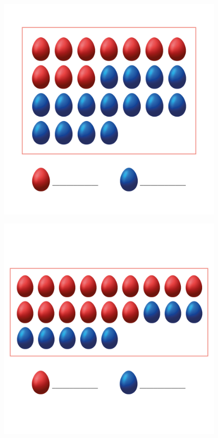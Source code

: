 \begin{figure}[htpb!]
\includegraphics[width=\textwidth]{../ilustracoes/MAT5/SAEB_5ANO_MAT_figura75-3.png}
\end{figure}

\begin{figure}[htpb!]
\includegraphics[width=\textwidth]{../ilustracoes/MAT5/SAEB_5ANO_MAT_figura75-4.png}
\end{figure}

